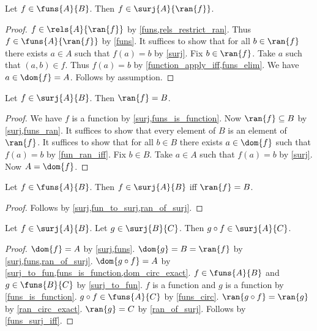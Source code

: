 \begin{lemma}\label{fun_to_surj}
    Let $f\in\funs{A}{B}$.
    Then $f\in\surj{A}{\ran{f}}$.
\end{lemma}
\begin{proof}
    $f\in\rels{A}{\ran{f}}$ by \cref{funs,rels_restrict_ran}.
    Thus $f\in\funs{A}{\ran{f}}$ by \cref{funs}.
    It suffices to show that for all $b\in\ran{f}$ there exists $a\in A$ such that $f(a) = b$ by \cref{surj}.
    Fix $b\in\ran{f}$.
    Take $a$ such that $(a,b)\in f$.
    Thus $f(a)=b$ by \cref{function_apply_iff,funs_elim}.
    We have $a\in\dom{f} = A$.
    Follows by assumption.
\end{proof}

\begin{corollary}\label{ran_of_surj}
    Let $f\in\surj{A}{B}$.
    Then $\ran{f} = B$.
\end{corollary}
\begin{proof}
    We have $f$ is a function by \cref{surj,funs_is_function}.
    Now $\ran{f}\subseteq B$ by \cref{surj,funs_ran}.
    It suffices to show that every element of $B$ is an element of $\ran{f}$.
    It suffices to show that for all $b\in B$
    there exists $a\in\dom{f}$ such that $f(a) = b$ by \cref{fun_ran_iff}.
    Fix $b\in B$.
    Take $a\in A$ such that $f(a) = b$ by \cref{surj}.
    Now $A=\dom{f}$.
\end{proof}

\begin{corollary}\label{funs_surj_iff}
    Let $f\in\funs{A}{B}$.
    Then $f\in\surj{A}{B}$ iff $\ran{f} = B$.
\end{corollary}
\begin{proof}
    Follows by \cref{surj,fun_to_surj,ran_of_surj}.
\end{proof}

\begin{proposition}\label{surjections_circ}
    Let $f\in\surj{A}{B}$.
    Let $g\in\surj{B}{C}$.
    Then $g\circ f\in\surj{A}{C}$.
\end{proposition}
\begin{proof}
    $\dom{f} = A$ by \cref{surj,funs}.
    $\dom{g} = B = \ran{f}$ by \cref{surj,funs,ran_of_surj}.
    $\dom{g\circ f} = A$ by \cref{surj_to_fun,funs_is_function,dom_circ_exact}.
    $f\in\funs{A}{B}$ and $g\in\funs{B}{C}$ by \cref{surj_to_fun}.
    $f$ is a function and $g$ is a function by \cref{funs_is_function}.
    $g\circ f\in\funs{A}{C}$ by \cref{funs_circ}.
    $\ran{g\circ f}=\ran{g}$ by \cref{ran_circ_exact}.
    $\ran{g}=C$ by \cref{ran_of_surj}.
    Follows by \cref{funs_surj_iff}.
\end{proof}



